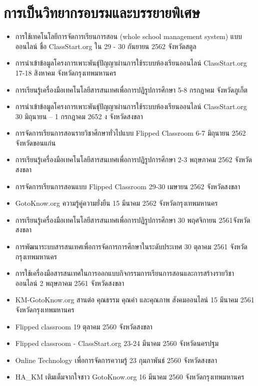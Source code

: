 \section*{การเป็นวิทยากรอบรมและบรรยายพิเศษ}

\begin{tcolorbox}[breakable,enhanced,fonttitle=\bfseries]
\begin{itemize}
	\item การใช้เทคโนโลยีการจัดการเรียนการสอน (whole school management system) แบบออนไลน์ ชื่อ ClassStart.org ใน 29 - 30 กันยายน 2562  จังหวัดสตูล
	\item การนำเข้าข้อมูลโครงการเพาะพันธุ์ปัญญาผ่านการใช้ระบบห้องเรียนออนไลน์ ClassStart.org 17-18 สิงหาคม  จังหวัดกรุงเทพมหานคร
	\item การเรียนรู้เครื่องมือเทคโนโลยีสารสนเทศเพื่อการปฏิรูปการศึกษา 5-8 กรกฎาคม  จังหวัดภูเก็ต
	\item การนำเข้าข้อมูลโครงการเพาะพันธุ์ปัญญาผ่านการใช้ระบบห้องเรียนออนไลน์ ClassStart.org 30 มิถุนายน – 1 กรกฎาคม 2652 ง จังหวัดสงขลา
	\item การจัดการเรียนการสอนรายวิชาศึกษาทั่วไปแบบ Flipped Classroom 6-7 มิถุนายน 2562  จังหวัดขอนแก่น
	\item การเรียนรู้เครื่องมือเทคโนโลยีสารสนเทศเพื่อการปฏิรูปการศึกษา 2-3 พฤษภาคม 2562  จังหวัดสงขลา
	\item การจัดการเรียนการสอนแบบ Flipped Classroom 29-30 เมษายน 2562  จังหวัดสงขลา
	\item GotoKnow.org ความรู้คู่ความยั่งยืน 15 มีนาคม 2562  จังหวัดกรุงเทพมหานคร
	\item การเรียนรู้เครื่องมือเทคโนโลยีสารสนเทศเพื่อการปฏิรูปการศึกษา 30 พฤศจิกายน 2561จังหวัดสงขลา
	\item การพัฒนาระบบสารสนเทศเพื่อการจัดการการศึกษาในระดับประเทศ 30 ตุลาคม 2561  จังหวัดกรุงเทพมหานคร
	\item การใช้เครื่องมือสารสนเทศในการออกแบบกิจกรรมการเรียนการสอนและการสร้างรายวิชาออนไลน์ 2 พฤษภาคม 2561 จังหวัดสงขลา
	\item KM-GotoKnow.org สานต่อ คุณธรรม คุณค่า และคุณภาพ สังคมออนไลน์ 15 มีนาคม 2561 จังหวัดกรุงเทพมหานคร
	\item Flipped classroom 19 ตุลาคม 2560  จังหวัดสงขลา
	\item Flipped classroom - ClassStart.org 23-24 มีนาคม 2560  จังหวัดนครปฐม
	\item Online Technology เพื่อการจัดการความรู้ 23 กุมภาพันธ์ 2560  จังหวัดสงขลา
	\item HA_KM เติมเต็มจากใจชาว GotoKnow.org 16 มีนาคม 2560 จังหวัดกรุงเทพมหานคร

\end{itemize}
\end{tcolorbox}
